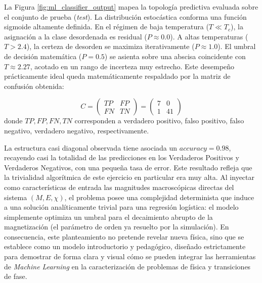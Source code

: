 La Figura \ref{fig:ml_classifier_output} mapea la topología predictiva evaluada sobre el conjunto de prueba (\textit{test}). La distribución estocástica conforma una función sigmoide altamente definida. En el régimen de baja temperatura ($T \ll T_c$), la asignación a la clase desordenada es residual ($P \approx 0.0$). A altas temperaturas ($T > 2.4$), la certeza de desorden se maximiza iterativamente ($P \approx 1.0$). El umbral de decisión matemática ($P = 0.5$) se asienta sobre una abscisa coincidente con $T \approx 2.27$, acotado en un rango de incerteza muy estrecho. Este desempeño prácticamente ideal queda matemáticamente respaldado por la matriz de confusión obtenida:

\begin{equation}
    C =  \begin{pmatrix}
    TP & FP \\
    FN & TN
    \end{pmatrix} = \begin{pmatrix}
    7 & 0 \\
    1 & 41
    \end{pmatrix}
    \label{eq:confusion_matrix}
\end{equation}
donde $TP, FP,FN, TN$ corresponden a verdadero positivo, falso positivo, falso negativo, verdadero negativo, respectivamente.

La estructura casi diagonal observada tiene asociada un $accuracy = 0.98$, recayendo casi la totalidad de las predicciones en los Verdaderos Positivos y Verdaderos Negativos, con una pequeña tasa de error. Este resultado refleja que la trivialidad algorítmica de este ejercicio en particular era muy alta. Al inyectar como características de entrada las magnitudes macroscópicas directas del sistema $(M, E, \chi)$, el problema posee una complejidad determinista que induce a una solución analíticamente trivial para una regresión logística: el modelo simplemente optimiza un umbral para el decaimiento abrupto de la magnetización (el parámetro de orden ya resuelto por la simulación). En consecuencia, este planteamiento no pretende revelar nueva física, sino que se establece como un modelo introductorio y pedagógico, diseñado estrictamente para demostrar de forma clara y visual cómo se pueden integrar las herramientas de \textit{Machine Learning} en la caracterización de problemas de física y transiciones de fase.